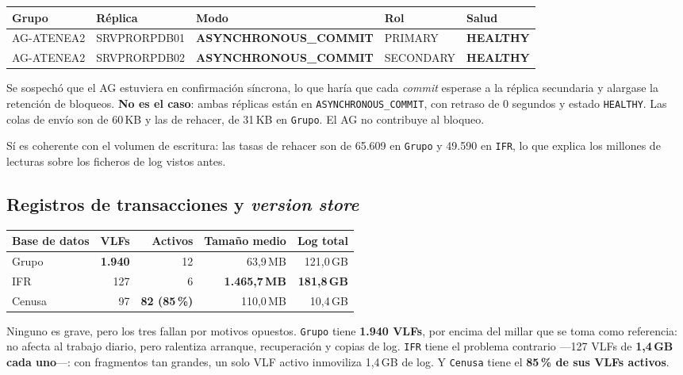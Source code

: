 \documentclass[11pt,a4paper]{article}
\newcommand{\cod}[1]{\texttt{\small #1}}
\newcommand{\critico}[1]{\textcolor{rojo}{\textbf{#1}}}
\newcommand{\bien}[1]{\textcolor{verde}{\textbf{#1}}}
\newcommand{\aviso}[1]{\textcolor{ambar}{\textbf{#1}}}
\begin{document}
\begin{table}[h]
\centering
\small
\begin{tabular}{lllll}
\toprule
\textbf{Grupo} & \textbf{Réplica} & \textbf{Modo} & \textbf{Rol} &
\textbf{Salud} \\
\midrule
AG-ATENEA2 & SRVPRORPDB01 & \bien{ASYNCHRONOUS\_COMMIT} & PRIMARY & \bien{HEALTHY} \\
AG-ATENEA2 & SRVPRORPDB02 & \bien{ASYNCHRONOUS\_COMMIT} & SECONDARY & \bien{HEALTHY} \\
\bottomrule
\end{tabular}
\end{table}

Se sospechó que el AG estuviera en confirmación síncrona, lo que haría que
cada \emph{commit} esperase a la réplica secundaria y alargase la retención
de bloqueos. \textbf{No es el caso}: ambas réplicas están en
\cod{ASYNCHRONOUS\_COMMIT}, con retraso de 0 segundos y estado
\cod{HEALTHY}. Las colas de envío son de 60\,KB y las de rehacer, de 31\,KB
en \cod{Grupo}. El AG no contribuye al bloqueo.

Sí es coherente con el volumen de escritura: las tasas de rehacer son de
65.609 en \cod{Grupo} y 49.590 en \cod{IFR}, lo que explica los millones de
lecturas sobre los ficheros de log vistos antes.

\subsection{Registros de transacciones y \emph{version store}}
\label{sec:logs}

\begin{table}[h]
\centering
\small
\begin{tabular}{lrrrr}
\toprule
\textbf{Base de datos} & \textbf{VLFs} & \textbf{Activos} &
\textbf{Tamaño medio} & \textbf{Log total} \\
\midrule
Grupo  & \aviso{1.940} & 12 & 63,9\,MB & 121,0\,GB \\
IFR    & 127 & 6 & \aviso{1.465,7\,MB} & \critico{181,8\,GB} \\
Cenusa & 97 & \aviso{82 (85\,\%)} & 110,0\,MB & 10,4\,GB \\
\bottomrule
\end{tabular}
\end{table}

Ninguno es grave, pero los tres fallan por motivos opuestos. \cod{Grupo}
tiene \textbf{1.940 VLFs}, por encima del millar que se toma como
referencia: no afecta al trabajo diario, pero ralentiza arranque,
recuperación y copias de log. \cod{IFR} tiene el problema contrario —127 VLFs
de \textbf{1,4\,GB cada uno}—: con fragmentos tan grandes, un solo VLF activo
inmoviliza 1,4\,GB de log. Y \cod{Cenusa} tiene el \textbf{85\,\% de sus VLFs
activos}.
\end{document}
